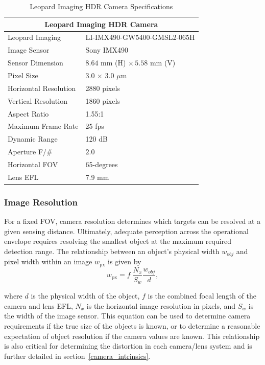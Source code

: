 \documentclass{erauthesis}
\begin{document}
\begin{table}[htpb]
\centering
\begin{tabular}{ll}
\hline
\multicolumn{2}{c}{Leopard Imaging HDR Camera}\\
\hline
\hline
Leopard Imaging & LI-IMX490-GW5400-GMSL2-065H \\
Image Sensor & Sony IMX490 \\
Sensor Dimension & $8.64$ mm (H) $\times\, 5.58$ mm (V) \\ 
Pixel Size & 3.0 $\times$ 3.0 $\mu$m \\
Horizontal Resolution & 2880 pixels \\
Vertical Resolution & 1860 pixels \\
Aspect Ratio & 1.55:1 \\
Maximum Frame Rate & 25 fps \\
Dynamic Range & 120 dB \\
Aperture F/\# & $2.0$ \\
Horizontal \Ac{FOV} & 65-degrees \\ %
Lens \Ac{EFL} & 7.9 mm\\
\hline
\end{tabular}
\caption{Leopard Imaging HDR Camera Specifications}
\label{table:hdr_camera_specs}
\end{table}


\subsubsection{Image Resolution}
\label{image_resolution}
For a fixed FOV, camera resolution determines which targets can be resolved at a given sensing distance. 
Ultimately, adequate perception across the operational envelope requires resolving the smallest object at the maximum required detection range. 
The relationship between an object's physical width $\mathit{w}_{obj}$ and pixel width within an image $\mathit{w}_{\text{px}}$ is given by
\begin{equation}\label{eq:pixel_width}
\mathit{w}_{\text{px}} = f \; \frac{N_x}{S_w}\frac{\mathit{w}_{obj}}{d},
\end{equation}

where $d$ is the physical width of the object, $f$ is the combined focal length of the camera and lens \acl{EFL}, $N_x$ is the horizontal image resolution in pixels, and $S_w$ is the width of the image sensor.
This equation can be used to determine camera requirements if the true size of the objects is known, or to determine a reasonable expectation of object resolution if the camera values are known.
This relationship is also critical for determining the distortion in each camera/lens system and is further detailed in section~\ref{camera_intrinsics}.
\end{document}

